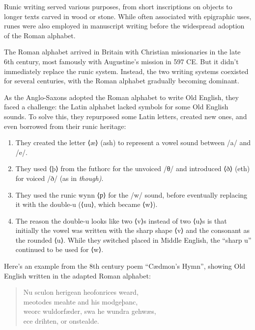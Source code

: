 Runic writing served various purposes, from short inscriptions on objects to longer texts carved in wood or stone. While often associated with epigraphic uses, runes were also employed in manuscript writing before the widespread adoption of the Roman alphabet.

The Roman alphabet arrived in Britain with Christian missionaries in the late 6th century, most famously with Augustine's mission in 597 CE. But it didn't immediately replace the runic system. Instead, the two writing systems coexisted for several centuries, with the Roman alphabet gradually becoming dominant.

As the Anglo-Saxons adopted the Roman alphabet to write Old English, they faced a challenge: the Latin alphabet lacked symbols for some Old English sounds. To solve this, they repurposed some Latin letters, created new ones, and even borrowed from their runic heritage:

\begin{enumerate}[noitemsep]
    \item They created the letter ⟨æ⟩ (ash) to represent a vowel sound between /a/ and /e/.

    \item They used ⟨þ⟩ from the futhorc for the unvoiced /θ/ and introduced ⟨ð⟩ (eth) for voiced /ð/ (as in \textit{though)}.

    \item They used the runic wynn ⟨ƿ⟩ for the /w/ sound, before eventually replacing it with the double-u (⟨uu⟩, which became ⟨w⟩).

    \item The reason the double-u looks like two ⟨v⟩s instead of two ⟨u⟩s is that initially the vowel was written with the sharp shape ⟨v⟩ and the consonant as the rounded ⟨u⟩. While they switched placed in Middle English, the ``sharp u'' continued to be used for ⟨w⟩.
\end{enumerate}

Here's an example from the 8th century poem ``Cædmon's Hymn'', showing Old English written in the adapted Roman alphabet:

\begin{quote}
Nu sculon herigean heofonrices weard,\\
meotodes meahte and his modgeþanc,\\
weorc wuldorfæder, swa he wundra gehwæs,\\
ece drihten, or onstealde.
\end{quote}


